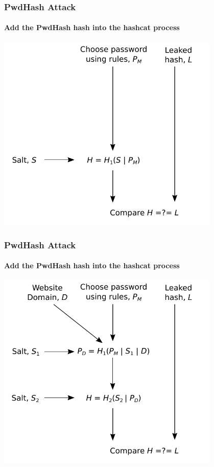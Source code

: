 \documentclass[handout, notes=hide]{beamer}
\begin{document}
\begin{frame}
\frametitle{PwdHash Attack}
\framesubtitle{Add the PwdHash hash into the hashcat process}
\setlength{\parskip}{0.5em}

\includegraphics[width=0.8\textwidth]{hashcat-usual}

\end{frame}


\begin{frame}
\frametitle{PwdHash Attack}
\framesubtitle{Add the PwdHash hash into the hashcat process}
\setlength{\parskip}{0.5em}

\includegraphics[width=0.8\textwidth]{hashcat-pwdhash}

\end{frame}
\end{document}
